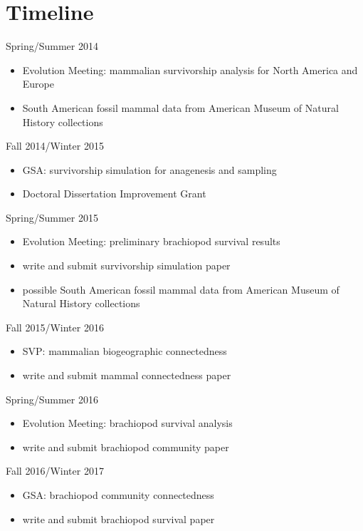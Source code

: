 \documentclass[12pt,letterpaper]{article}
\begin{document}
\clearpage

\section{Timeline}

Spring/Summer 2014
\begin{itemize}
  \item Evolution Meeting: mammalian survivorship analysis for North America and Europe
  \item South American fossil mammal data from American Museum of Natural History collections
\end{itemize}

Fall 2014/Winter 2015
\begin{itemize}
  \item GSA: survivorship simulation for anagenesis and sampling
  \item Doctoral Dissertation Improvement Grant
\end{itemize}

Spring/Summer 2015
\begin{itemize}
  \item Evolution Meeting: preliminary brachiopod survival results
  \item write and submit survivorship simulation paper
  \item possible South American fossil mammal data from American Museum of Natural History collections
\end{itemize}

Fall 2015/Winter 2016
\begin{itemize}
  \item SVP: mammalian biogeographic connectedness
  \item write and submit mammal connectedness paper
\end{itemize}

Spring/Summer 2016
\begin{itemize}
  \item Evolution Meeting: brachiopod survival analysis
  \item write and submit brachiopod community paper
\end{itemize}

Fall 2016/Winter 2017
\begin{itemize}
  \item GSA: brachiopod community connectedness
  \item write and submit brachiopod survival paper
\end{itemize}
\end{document}
